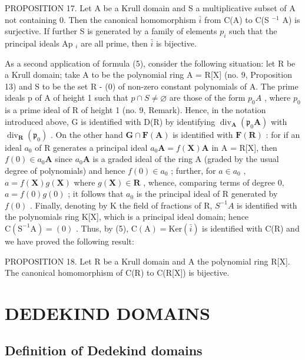 PROPOSITION 17. Let A be a Krull domain and S a multiplicative subset of A not containing 0. Then the canonical homomorphism \(\bar{i}\) from C(A) to C(S \(^{-1}\) A) is surjective. If further S is generated by a family of elements \(p_{i}\) such that the principal ideals Ap \(_{i}\) are all prime, then \(\bar{i}\) is bijective.

As a second application of formula (5), consider the following situation: let R be a Krull domain; take A to be the polynomial ring A = R{[}X{]} (no. 9, Proposition 13) and S to be the set R - (0) of non-zero constant polynomials of A. The prime ideals p of A of height 1 such that \(p \cap S \neq \varnothing\) are those of the form \(p_{0}A\) , where \(p_{0}\) is a prime ideal of R of height 1 (no. 9, Remark). Hence, in the notation introduced above, G is identified with D(R) by identifying \(\operatorname{div}_{\mathbf{A}}(\mathfrak{p}_{0}\mathbf{A})\) with \(\operatorname{div}_{\mathbf{R}}(\mathfrak{p}_{0})\) . On the other hand \(\mathbf{G} \cap \mathbf{F}(\mathbf{A})\) is identified with \(\mathbf{F}(\mathbf{R})\) : for if an ideal \(a_{0}\) of R generates a principal ideal \(a_{0}\mathbf{A} = f(\mathbf{X})\mathbf{A}\) in A = R{[}X{]}, then \(f(0) \in a_{0}\mathbf{A}\) since \(a_{0}\mathbf{A}\) is a graded ideal of the ring A (graded by the usual degree of polynomials) and hence \(f(0) \in a_{0}\) ; further, for \(a \in a_{0}\) , \(a = f(\mathbf{X})g(\mathbf{X})\) where \(g(\mathbf{X}) \in \mathbf{R}\) , whence, comparing terms of degree 0, \(a = f(0)g(0)\) ; it follows that \(a_{0}\) is the principal ideal of R generated by \(f(0)\) . Finally, denoting by K the field of fractions of R, \(S^{-1}A\) is identified with the polynomials ring K{[}X{]}, which is a principal ideal domain; hence \(\mathrm{C}(\mathrm{S}^{-1}\mathrm{A}) = (0)\) . Thus, by (5), \(\mathrm{C}(\mathrm{A}) = \mathrm{Ker}(\bar{i})\) is identified with C(R) and we have proved the following result:

PROPOSITION 18. Let R be a Krull domain and A the polynomial ring R{[}X{]}. The canonical homomorphism of C(R) to C(R{[}X{]}) is bijective.

\section{DEDEKIND DOMAINS}

\subsection{Definition of Dedekind domains}

